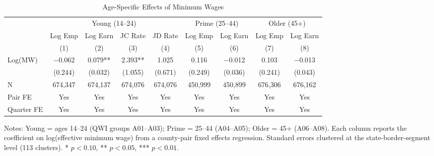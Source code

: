 \begin{table}[H]
\centering
\caption{Age-Specific Effects of Minimum Wages}
\label{tab:age}
\scriptsize
\begin{tabular}{lcccccccc}
\toprule
 & \multicolumn{4}{c}{Young (14--24)} & \multicolumn{2}{c}{Prime (25--44)} & \multicolumn{2}{c}{Older (45+)} \\
\cmidrule(lr){2-5} \cmidrule(lr){6-7} \cmidrule(lr){8-9}
 & Log Emp & Log Earn & JC Rate & JD Rate & Log Emp & Log Earn & Log Emp & Log Earn \\
 & (1) & (2) & (3) & (4) & (5) & (6) & (7) & (8) \\
\midrule
Log(MW) & $-$0.062 & 0.079** & 2.393** & 1.025 & 0.116 & $-$0.012 & 0.103 & $-$0.013 \\
 & (0.244) & (0.032) & (1.055) & (0.671) & (0.249) & (0.036) & (0.241) & (0.043) \\
\midrule
N & 674,347 & 674,137 & 674,076 & 674,076 & 450,999 & 450,899 & 676,306 & 676,162 \\
Pair FE & Yes & Yes & Yes & Yes & Yes & Yes & Yes & Yes \\
Quarter FE & Yes & Yes & Yes & Yes & Yes & Yes & Yes & Yes \\
\bottomrule
\end{tabular}

\vspace{0.3em}
\parbox{\textwidth}{\scriptsize Notes: Young = ages 14--24 (QWI groups A01--A03); Prime = 25--44 (A04--A05); Older = 45+ (A06--A08). Each column reports the coefficient on log(effective minimum wage) from a county-pair fixed effects regression. Standard errors clustered at the state-border-segment level (113 clusters). * $p<0.10$, ** $p<0.05$, *** $p<0.01$.}
\end{table}
